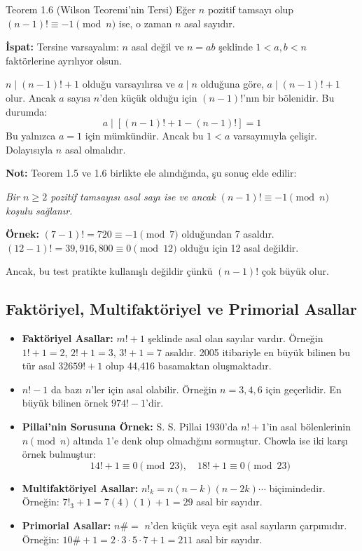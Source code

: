 \documentclass[12pt]{article}
\begin{document}
\begin{theorembox}{Teorem 1.6 (Wilson Teoremi'nin Tersi)}
Eğer $n$ pozitif tamsayı olup $(n - 1)! \equiv -1 \pmod{n}$ ise, o zaman $n$ asal sayıdır.

\textbf{İspat:}  
Tersine varsayalım: $n$ asal değil ve $n = ab$ şeklinde $1 < a, b < n$ faktörlerine ayrılıyor olsun.

$n \mid (n - 1)! + 1$ olduğu varsayılırsa ve $a \mid n$ olduğuna göre, $a \mid (n - 1)! + 1$ olur.  
Ancak $a$ sayısı $n$'den küçük olduğu için $(n - 1)!$'nın bir bölenidir. Bu durumda:
\[
a \mid [(n - 1)! + 1 - (n - 1)!] = 1
\]
Bu yalnızca $a = 1$ için mümkündür. Ancak bu $1 < a$ varsayımıyla çelişir. Dolayısıyla $n$ asal olmalıdır.
\end{theorembox}

\textbf{Not:} Teorem 1.5 ve 1.6 birlikte ele alındığında, şu sonuç elde edilir:

\begin{center}
\textit{Bir $n \geq 2$ pozitif tamsayısı asal sayı ise ve ancak $(n - 1)! \equiv -1 \pmod{n}$ koşulu sağlanır.}
\end{center}

\textbf{Örnek:}  
$(7 - 1)! = 720 \equiv -1 \pmod{7}$ olduğundan 7 asaldır.  
$(12 - 1)! = 39,916,800 \equiv 0 \pmod{12}$ olduğu için 12 asal değildir.

Ancak, bu test pratikte kullanışlı değildir çünkü $(n - 1)!$ çok büyük olur.

\subsection*{Faktöriyel, Multifaktöriyel ve Primorial Asallar}

\begin{itemize}[leftmargin=1.5em, noitemsep, topsep=0pt]
    \item \textbf{Faktöriyel Asallar:}  
    $m! + 1$ şeklinde asal olan sayılar vardır. Örneğin $1! + 1 = 2$, $2! + 1 = 3$, $3! + 1 = 7$ asaldır.  
    2005 itibariyle en büyük bilinen bu tür asal $32659! + 1$ olup 44,416 basamaktan oluşmaktadır.
    
    \item $n! - 1$ da bazı $n$'ler için asal olabilir. Örneğin $n = 3, 4, 6$ için geçerlidir. En büyük bilinen örnek $974! - 1$'dir.
    
    \item \textbf{Pillai'nin Sorusuna Örnek:}  
    S. S. Pillai 1930'da $n! + 1$'in asal bölenlerinin $n \pmod{n}$ altında $1$'e denk olup olmadığını sormuştur. Chowla ise iki karşı örnek bulmuştur:
    \[
    14! + 1 \equiv 0 \pmod{23}, \quad 18! + 1 \equiv 0 \pmod{23}
    \]

    \item \textbf{Multifaktöriyel Asallar:}  
    $n!_k = n(n-k)(n-2k)\cdots$ biçimindedir.  
    Örneğin: $7!_3 + 1 = 7(4)(1) + 1 = 29$ asal bir sayıdır.

    \item \textbf{Primorial Asallar:}  
    $n\# = $ $n$'den küçük veya eşit asal sayıların çarpımıdır.  
    Örneğin: $10\# + 1 = 2 \cdot 3 \cdot 5 \cdot 7 + 1 = 211$ asal bir sayıdır.
\end{itemize}
\end{document}
